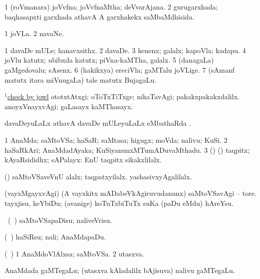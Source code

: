 \bentry
{}
\gl{\gu}
\bmng
\bnum
\num{1} (roVmanara) joVvfna; joVvfnaMtha; deVvarAjana. 
\num{2} gurugarxhada; baqhasapxti garxhada athavA A garxhakekx saMbaMdhisida. 
\enum
\emng
\eentry

\bentry
{}
\gl{\nA}
\bmng
\bnum
\num{1} joVLa. 
\num{2} navaNe. 
\enum
\emng
\eentry

\bentry
{}
\gl{\nA}
\bmng
\bnum
\num{1} davaDe mULe; hanavxsithx. 
\num{2} davaDe. 
\num{3} kenenx; galalx; kapoVla; kadapu. 
\num{4} joVlu katutx; ubibxda katutx; piVna-kaMTha, galalx. 
\num{5} (danagaLa) gaMgedovalu; sAsenx. 
\num{6} (hakikxya) ereciVla; gaMTalu joVLige. 
\num{7} (sAmanf matutx itara miVnugaLa) tale matutx BujagaLu. 
\enum
\emng

\noindent
\gl{\nuga}
\bmng
\hyperref{kandict_c.pdf}{C}{cheek(1) nuga(1)}{$^1$cheek by jowl} 
\banum
{} ototxtAtxgi; oToTxTiTxge; nikaTavAgi; pakakxpakakxdalilx. 
 anoyxVnayxvAgi; gaLasayx kaMThasayx. 
\eanum
\emng
\eentry

\bentry
{}
\gl{\saupa}
\bmng
davaDeyuLaLx athavA davaDe mULeyuLaLx eMbathaRda \saupa. 
\emng
\eentry

\bentry
{}
\gl{\nA}
\bmng
\bnum
\num{1} AnaMda; saMtoVSa; haSaR; saMtasa; higugx; moVda; nalivu; KuSi. 
\num{2} haSaRkAri; AnaMdadAyaka; KuSiyanunxMTumADuvaMthadu. 
\num{3} (\birx) (\AmA) taqpitx; kAyaRsididhx; sAPalayx:  EnU taqpitx sikakxlilalx. 
\enum
\emng

\noindent
\gl{\pagu}
\bmng
{} (\AmA) 
\banum
{} saMtoVSaveVnU alalx; taqpatxyilalx. 
 yashasivxyAgalilalx. 
\eanum
\emng

\noindent
\gl{\nuga}
\bmng
{}  (vayxMgayxvAgi) (A vayxkitx mADabeVkAgiruvudanunx) saMtoVSavAgi -- tore. tayxjisu, keYbiDu; (avanige) koTuTxbiTuTx suKa (paDu eMdu) hAreYsu. 
\emng
\eentry

\bentry
{}
\gl{\kirx}
\bmng
\sakirx\ (\kanmu\ \kAparx) saMtoVSapaDisu; naliveVrisu. 
\emng

\noindent
\gl{\akirx}
\bmng
(\kanmu\ \kAparx) haSiRsu; nali; AnaMdapaDu. 
\emng
\eentry

\bentry
{}
\gl{\nA}
\bmng
(\kanmu\ \kAparx) 
\bnum
\num{1} AnaMdoVlAlxsa; saMtoVSa. 
\num{2} utasxva. 
\enum
\emng
\eentry

\bentry
{}
\gl{\nA}
\bmng
AnaMdada gaMTegaLu; (utasxva kAladalilx bAjisuva) nalivu gaMTegaLu. 
\emng
\eentry

